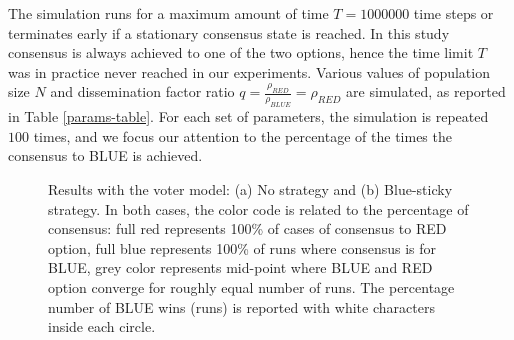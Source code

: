 \documentclass[sigconf]{acmart}
\begin{document}
The simulation runs for a maximum  amount of time $T=1000000$ time steps or terminates early if a stationary consensus state is reached. In this study consensus is always achieved to one of the two options, hence the time limit $T$ was in practice never reached in our experiments. Various values of population size $N$ and dissemination factor ratio $q=\frac{\rho_{RED}}{\rho_{BLUE}} =\rho_{RED}$ are simulated, as reported in Table \ref{params-table}. 
For each set of parameters, the simulation  is repeated $100$ times, and we focus our attention to the percentage of the times the consensus to BLUE is achieved.

\begin{figure}[t]
  \centering
  \hfill
  \caption{Results with the voter model: (a)  No strategy and (b) Blue-sticky strategy. In both cases, the color code is related to the percentage of consensus: full red represents 100\% of cases of consensus to RED option, full blue represents 100\% of runs where consensus is for BLUE, grey color represents mid-point where BLUE and RED option converge for roughly equal number of runs. The percentage number of BLUE wins (runs) is reported with white characters inside each circle.%
  }
  \label{fig:voter}
\end{figure}
\end{document}
